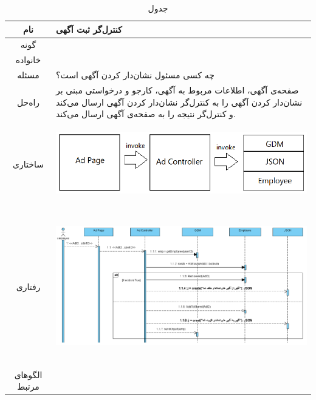 \begin{table}[H]
	\begin{adjustbox}{width=\textwidth}
		\begin{tabular}{|c|p{\textwidth}|}
			\hline
			نام &
			کنترل‌گر ثبت آگهی \\ 
			\hline
			گونه & 
			\grasp \\
			\hline
			خانواده &
			\controller \\
			\hline
			مسئله & 
			چه کسی مسئول نشان‌دار کردن آگهی است؟\\
			\hline
			راه‌حل& 
			صفحه‌ی آگهی، اطلاعات مربوط به آگهی، کارجو و درخواستی مبنی بر نشان‌دار کردن آگهی را به کنترل‌گر نشان‌دار کردن آگهی ارسال می‌کند و کنترل‌گر نتیجه را به صفحه‌ی آگهی ارسال می‌کند. \\
			\hline
			ساختاری & 
			\begin{minipage}{\textwidth}
				\begin{flushleft}
					\begin{minipage}{\textwidth}
						\includegraphics[width=13cm, height=2.7cm]{./images/7-4-1}
					\end{minipage}
				\end{flushleft}
			\end{minipage}
			
			\\
			\hline
			رفتاری & 
			\begin{minipage}{\textwidth}
				\begin{flushleft}
					\begin{minipage}{\textwidth}
						\includegraphics[width=13.5cm, height=6cm]{./images/7-4-2}
					\end{minipage}
				\end{flushleft}
			\end{minipage}
			\\
			\hline
			الگو‌های مرتبط& \\
			\hline
		\end{tabular}
	\end{adjustbox}
	\caption{جدول }
	\label{table-with-pic:4}
\end{table}
